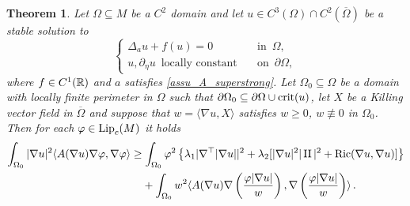 \documentclass[10 pt,a4paper]{article}
\newtheorem{theorem}[definition]{Theorem}
\theoremstyle{definition}
\begin{document}
\begin{theorem} \label{teo_Poincare_loc}
	Let $\Omega \subseteq M$ be a $C^2$ domain and let $u \in C^3(\Omega) \cap C^2(\overline\Omega)$ be a stable solution to 
	\[
	\left\{ \begin{array}{ll}
		\Delta_a u + f(u)=0 & \quad \text{in } \, \Omega, \\[0.2cm]
		u, \partial_\eta u \, \text{ locally constant} & \quad \text{on } \, \partial \Omega, 
	\end{array}
	\right.
	\]
	where $f \in C^1(\mathbb R)$ and $a$ satisfies \eqref{assu_A_superstrong}. Let $\Omega_0\subseteq\Omega$ be a domain with locally finite perimeter in $\Omega$ such that $\partial\Omega_0 \subseteq \partial\Omega \cup {\rm crit}(u)$, let $X$ be a Killing vector field in $\overline\Omega$ and suppose that $w = \langle \nabla u, X \rangle$ satisfies $w \ge 0$, $w \not\equiv 0$ in $\Omega_0$. Then for each $\varphi \in \mathrm{Lip}_c(M)$ it holds
	\begin{equation} \label{piufinalissima_teo3}
		\begin{split}
			\int_{\Omega_0} |\nabla u|^2 \langle A(\nabla u)\nabla\varphi,\nabla\varphi\rangle & \geq \int_{\Omega_0} \varphi^2 \left\{ \lambda_1|\nabla^\top|\nabla u||^2 + \lambda_2 [|\nabla u|^2|\operatorname{II}|^2 + \mathrm{Ric}(\nabla u,\nabla u)] \right\} \\
			& \phantom{=\;} + \int_{\Omega_0} w^2 \langle A(\nabla u)\nabla\left(\frac{\varphi|\nabla u|}{w}\right),\nabla\left(\frac{\varphi|\nabla u|}{w}\right)\rangle \, .
		\end{split}
	\end{equation}
\end{theorem}
\end{document}
